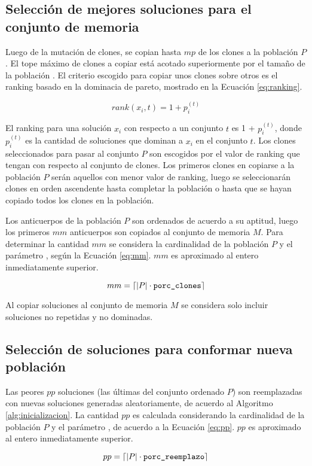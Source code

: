 \subsection{Selección de mejores soluciones para el conjunto de memoria}

Luego de la mutación de clones, se copian hasta $mp$ de los clones a la población $P$. El tope máximo de clones a copiar está acotado superiormente por el tamaño de la población \popsize. El criterio escogido para copiar unos clones sobre otros es el ranking basado en la dominacia de pareto, mostrado en la Ecuación \eqref{eq:ranking}.

\begin{equation}
\label{eq:ranking}
rank(x_i,t) = 1+p_i^{(t)}
\end{equation}

El ranking para una solución $x_i$ con respecto a un conjunto $t$ es 1 + $p_i^{(t)}$, donde $p_i^{(t)}$ es la cantidad de soluciones que dominan a $x_{i}$ en el conjunto $t$. Los clones seleccionados para pasar al conjunto $P$ son escogidos por el valor de ranking que tengan con respecto al conjunto de clones. Los primeros clones en copiarse a la población $P$ serán aquellos con menor valor de ranking, luego se seleccionarán clones en orden ascendente hasta completar la población \popsize{} o hasta que se hayan copiado todos los clones en la población.

Los anticuerpos de la población $P$ son ordenados de acuerdo a su aptitud, luego los primeros $mm$ anticuerpos son copiados al conjunto de memoria $M$. Para determinar la cantidad $mm$ se considera la cardinalidad de la población $P$ y el parámetro \pclones{}, según la Ecuación \eqref{eq:mm}. $mm$ es aproximado al entero inmediatamente superior.

\begin{equation}
\label{eq:mm}
mm = \ceil*{|P| \cdot \pclones}
\end{equation}

Al copiar soluciones al conjunto de memoria $M$ se considera solo incluir soluciones no repetidas y no dominadas.

\subsection{Selección de soluciones para conformar nueva población}

Las peores $pp$ soluciones (las últimas del conjunto ordenado $P$) son reemplazadas con nuevas soluciones generadas aleatoriamente, de acuerdo al Algoritmo \ref{alg:inicializacion}. La cantidad $pp$ es calculada considerando la cardinalidad de la población $P$ y el parámetro \preemplazo{}, de acuerdo a la Ecuación \ref{eq:pp}. $pp$ es aproximado al entero inmediatamente superior.

\begin{equation}
\label{eq:pp}
pp = \ceil*{|P| \cdot \preemplazo}
\end{equation}

